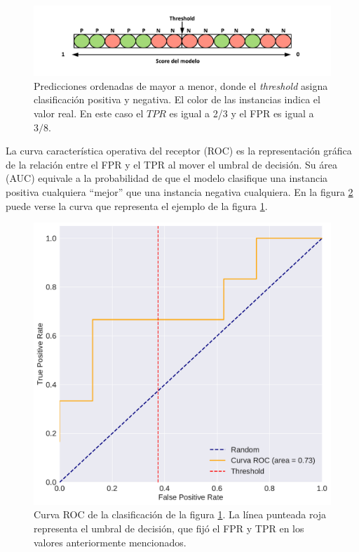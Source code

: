 \begin{itemize}
    \begin{figure}[H]
    \centering
        \includegraphics[scale=0.6]{documents/latex/figures/1/threshold_auc.pdf}
    \caption{Predicciones ordenadas de mayor a menor, donde el \textit{threshold} asigna clasificación positiva y negativa. El color de las instancias indica el valor real. En este caso el $TPR$ es igual a 2/3 y el FPR es igual a $3/8$.}
    \label{fig:threshold_auc}
    \end{figure}
    
    La curva característica operativa del receptor (ROC) es la representación gráfica de la relación entre el FPR y el TPR al mover el umbral de decisión. Su área (AUC) equivale a la probabilidad de que el modelo clasifique una instancia positiva cualquiera ``mejor'' que una instancia negativa cualquiera. En la figura \ref{fig:example_roc} puede verse la curva que representa el ejemplo de la figura \ref{fig:threshold_auc}.
    
    \begin{figure}[H]
        \centering
        \includegraphics[scale=0.4]{documents/latex/figures/1/roc_ejemplo.pdf}
        \caption{Curva ROC de la clasificación de la figura \ref{fig:threshold_auc}. La línea punteada roja representa el umbral de decisión, que fijó el FPR y TPR en los valores anteriormente mencionados.}
        \label{fig:example_roc}
    \end{figure}
    
    

\end{itemize}

